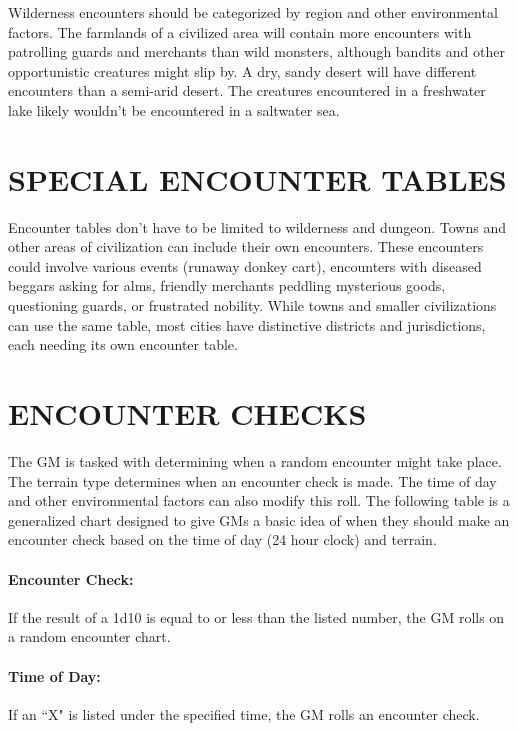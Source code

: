 \begin{multicols}{2}
Wilderness encounters should be categorized by region and other environmental factors.  The farmlands of a civilized area will contain more encounters with patrolling guards and merchants than wild monsters, although bandits and other opportunistic creatures might slip by.  A dry, sandy desert will have different encounters than a semi-arid desert.  The creatures encountered in a freshwater lake likely wouldn't be encountered in a saltwater sea.

\section{SPECIAL ENCOUNTER TABLES}

Encounter tables don't have to be limited to wilderness and dungeon.  Towns and other areas of civilization can include their own encounters.  These encounters could involve various events (runaway donkey cart), encounters with diseased beggars asking for alms, friendly merchants peddling mysterious goods, questioning guards, or frustrated nobility.  While towns and smaller civilizations can use the same table, most cities have distinctive districts and jurisdictions, each needing its own encounter table. 

\section{ENCOUNTER CHECKS}

The GM is tasked with determining when a random encounter might take place.  The terrain type determines when an encounter check is made.   The time of day and other environmental factors can also modify this roll.  The following table is a generalized chart designed to give GMs a basic idea of when they should make an encounter check based on the time of day (24 hour clock) and terrain.

\paragraph{Encounter Check:} If the result of a 1d10 is equal to or less than the listed number, the GM rolls on a random encounter chart.

\paragraph{Time of Day:} If an ``X" is listed under the specified time, the GM rolls an encounter check.  


\end{multicols}
